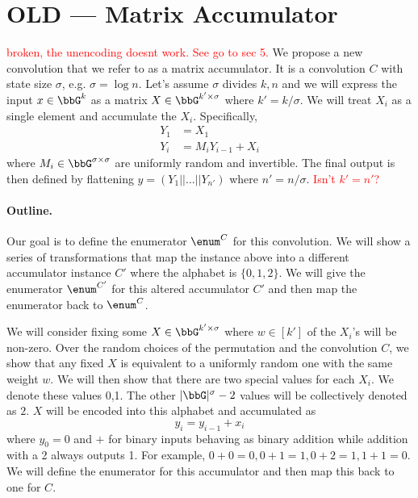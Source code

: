 \section{OLD --- Matrix Accumulator}
\textcolor{red}{broken, the unencoding doesnt work. See go to sec 5. }
We propose a new convolution that we refer to as a matrix accumulator. It is a convolution $C$ with state size $\sigma$, e.g. $\sigma=\log n$. Let's assume $\sigma$ divides $k,n$ and we will express the input $x\in \bbG^{k}$ as a matrix $X\in \bbG^{k' \times \sigma}$ where $k'=k/\sigma$.  We will treat $X_i$ as a single element and accumulate the $X_i$. Specifically,
\begin{align*}
Y_1 &= X_1\\
Y_i &= M_i Y_{i-1} + X_i
\end{align*}
where $M_i\in \bbG^{\sigma\times \sigma}$ are uniformly random and invertible. The final output is then defined by flattening $y=(Y_1 || ... || Y_{n'})$ where $n'=n/\sigma$. \textcolor{red}{Isn't $k' = n'$?}

\paragraph{Outline.} Our goal is to define the enumerator $\enum^C$ for this convolution.  We will show a series of transformations that map the instance above into a different accumulator instance $C'$ where the alphabet is $\{0,1,2\}$. We will give the enumerator $\enum^{C'}$ for this altered accumulator $C'$ and then map the enumerator back to $\enum^C$.

We will consider fixing some $X\in \bbG^{k'\times \sigma}$ where $w\in [k']$ of the $X_i$'s will be non-zero. Over the random choices of the permutation and the convolution $C$, we show that any fixed $X$ is equivalent to a uniformly random one with the same weight $w$. We will then show that there are two special values for each $X_i$. We denote these values 0,1. The other $|\bbG|^\sigma -2$ values will be collectively denoted as $2$. $X$ will be encoded into this alphabet and  accumulated as
$$
    y_i=y_{i-1} + x_i
$$
where $y_{0}=0$ and $+$ for binary inputs behaving as binary addition while addition with a 2 always outputs 1.
For example, $0+0=0,0+1=1, 0+2=1, 1+1=0$. We will define the enumerator for this accumulator and then map this back to one for $C$.


